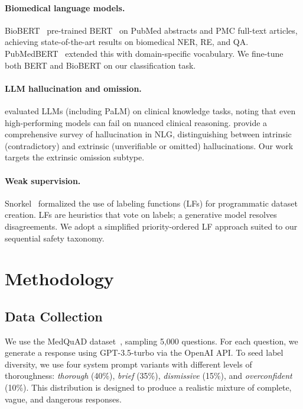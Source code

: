 \documentclass[11pt,a4paper]{article}
\begin{document}
\paragraph{Biomedical language models.}
BioBERT~\citep{lee2020} pre-trained BERT~\citep{devlin2019} on PubMed abstracts and PMC full-text articles, achieving state-of-the-art results on biomedical NER, RE, and QA. PubMedBERT~\citep{gu2021} extended this with domain-specific vocabulary. We fine-tune both BERT and BioBERT on our classification task.

\paragraph{LLM hallucination and omission.}
\citet{singhal2023} evaluated LLMs (including PaLM) on clinical knowledge tasks, noting that even high-performing models can fail on nuanced clinical reasoning. \citet{ji2023} provide a comprehensive survey of hallucination in NLG, distinguishing between intrinsic (contradictory) and extrinsic (unverifiable or omitted) hallucinations. Our work targets the extrinsic omission subtype.

\paragraph{Weak supervision.}
Snorkel~\citep{ratner2017} formalized the use of labeling functions (LFs) for programmatic dataset creation. LFs are heuristics that vote on labels; a generative model resolves disagreements. We adopt a simplified priority-ordered LF approach suited to our sequential safety taxonomy.

\section{Methodology}
\label{sec:method}

\subsection{Data Collection}

We use the MedQuAD dataset~\citep{abachaa2019}, sampling 5{,}000 questions. For each question, we generate a response using GPT-3.5-turbo via the OpenAI API. To seed label diversity, we use four system prompt variants with different levels of thoroughness: \textit{thorough} (40\%), \textit{brief} (35\%), \textit{dismissive} (15\%), and \textit{overconfident} (10\%). This distribution is designed to produce a realistic mixture of complete, vague, and dangerous responses.
\end{document}
